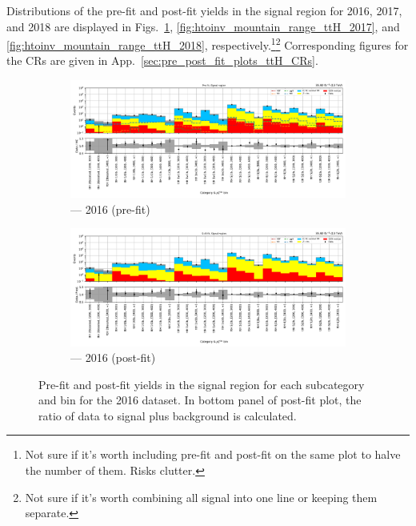 Distributions of the pre-fit and post-fit yields in the signal region for 2016, 2017, and 2018 are displayed in Figs.~\ref{fig:htoinv_mountain_range_ttH_2016}, \ref{fig:htoinv_mountain_range_ttH_2017}, and \ref{fig:htoinv_mountain_range_ttH_2018}, respectively.\footnote{Not sure if it's worth including pre-fit and post-fit on the same plot to halve the number of them. Risks clutter.}\footnote{Not sure if it's worth combining all signal into one \higgstoinv line or keeping them separate.} Corresponding figures for the \glspl{CR} are given in App.~\ref{sec:pre_post_fit_plots_ttH_CRs}.

\begin{figure}[htbp]
    \centering
    \begin{subfigure}[b]{0.9\textwidth}
        \includegraphics[width=\textwidth]{figures/mountain_ranges/2016/ttH/SR_tree_prefit-abs_values_ttH_cats.pdf}
        \caption{\ttH --- 2016 (pre-fit)}
    \end{subfigure}

    \begin{subfigure}[b]{0.9\textwidth}
        \includegraphics[width=\textwidth]{figures/mountain_ranges/2016/ttH/SR_tree_fit_s-abs_values_ttH_cats.pdf}
        \caption{\ttH --- 2016 (post-fit)}
    \end{subfigure}
    \caption[Pre-fit and post-fit yields in the signal region for each \ttH subcategory and \ptmiss bin for the 2016 dataset]{Pre-fit and post-fit yields in the signal region for each \ttH subcategory and \ptmiss bin for the 2016 dataset. In bottom panel of post-fit plot, the ratio of data to signal plus background is calculated.}
    \label{fig:htoinv_mountain_range_ttH_2016}
\end{figure}

